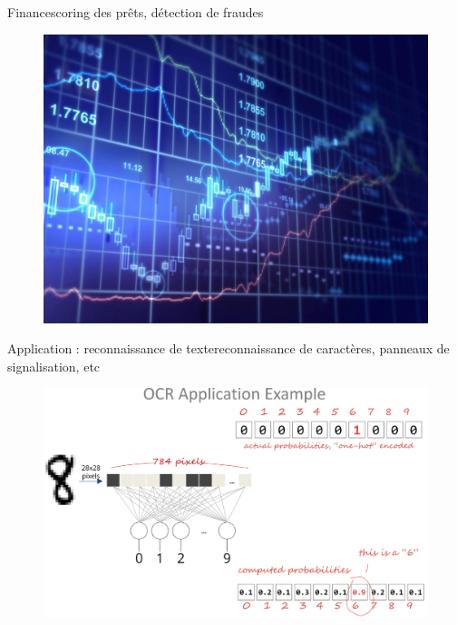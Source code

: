 \documentclass[compress]{beamer}
\begin{document}
\begin{frame}{Finance}{scoring des prêts, détection de fraudes}

	\begin{figure}
		\centering
		\includegraphics[width=0.85\linewidth]{resources/stock}

	\end{figure}


\end{frame}

\begin{frame}{Application : reconnaissance de texte}{reconnaissance de caractères, panneaux de signalisation, etc }

	\begin{figure}
		\centering
		\includegraphics[width=1\linewidth]{resources/text}
	\end{figure}

\end{frame}
\end{document}
